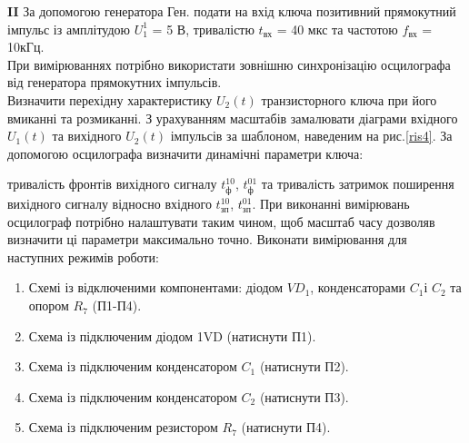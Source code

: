 \documentclass[a4paper,14pt]{extreport}
\begin{document}
\textbf{II} За допомогою генератора Ген. подати на вхід ключа позитивний
прямокутний імпульс із амплітудою $U_1^1$ = 5 В, тривалістю $t_{\text{вх}}$ = 40 мкс та частотою $f_{\text{вх}}$ = 10кГц.\\
При вимірюваннях потрібно використати зовнішню синхронізацію осцилографа від генератора прямокутних імпульсів.\\
Визначити перехідну характеристику $U_2(t)$ транзисторного ключа при
його вмиканні та розмиканні. З урахуванням масштабів замалювати діаграми
вхідного $U_1(t)$ та вихідного $U_2(t)$ імпульсів за шаблоном, наведеним на рис.\ref{ris4}. За допомогою осцилографа визначити динамічні параметри ключа:

тривалість фронтів вихідного сигналу $t^{10}_\text{ф}$, $t^{01}_\text{ф}$ та тривалість затримок поширення
вихідного сигналу відносно вхідного $t^{10}_\text{зп}$, $t^{01}_\text{зп}$. При
виконанні вимірювань осцилограф потрібно налаштувати таким чином, щоб
масштаб часу дозволяв визначити ці параметри максимально точно.
Виконати вимірювання для наступних режимів роботи:
\begin{enumerate}
	\item Схемі із відключеними компонентами: діодом $VD_1$, конденсаторами $C_1 $і $C_2$ та опором $R_7$ (П1-П4).
    \item Схема із підключеним діодом 1VD (натиснути П1).
    \item Схема із підключеним конденсатором $C_1$ (натиснути П2).
    \item Схема із підключеним конденсатором $C_2$ (натиснути П3).
    \item Схема із підключеним резистором $R_7$ (натиснути П4).
\end{enumerate}
\end{document}
